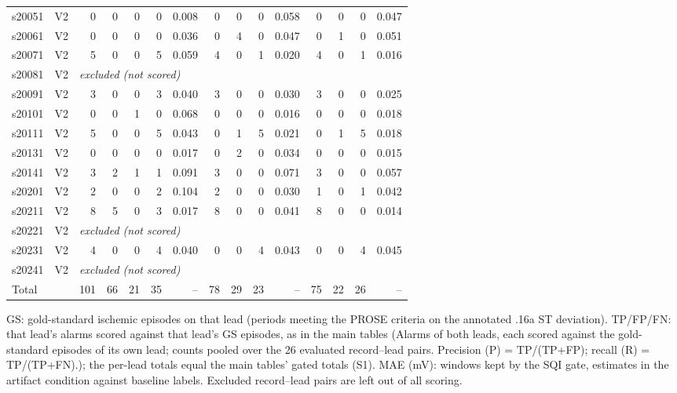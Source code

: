\begin{table}[htbp]
\begin{tabular}{llrrrrrrrrrrrrr}
s20051 & V2 & 0 & 0 & 0 & 0 & 0.008 & 0 & 0 & 0 & 0.058 & 0 & 0 & 0 & 0.047 \\
s20061 & V2 & 0 & 0 & 0 & 0 & 0.036 & 0 & 4 & 0 & 0.047 & 0 & 1 & 0 & 0.051 \\
s20071 & V2 & 5 & 0 & 0 & 5 & 0.059 & 4 & 0 & 1 & 0.020 & 4 & 0 & 1 & 0.016 \\
s20081 & V2 & \multicolumn{13}{l}{\textit{excluded (not scored)}} \\
s20091 & V2 & 3 & 0 & 0 & 3 & 0.040 & 3 & 0 & 0 & 0.030 & 3 & 0 & 0 & 0.025 \\
s20101 & V2 & 0 & 0 & 1 & 0 & 0.068 & 0 & 0 & 0 & 0.016 & 0 & 0 & 0 & 0.018 \\
s20111 & V2 & 5 & 0 & 0 & 5 & 0.043 & 0 & 1 & 5 & 0.021 & 0 & 1 & 5 & 0.018 \\
s20131 & V2 & 0 & 0 & 0 & 0 & 0.017 & 0 & 2 & 0 & 0.034 & 0 & 0 & 0 & 0.015 \\
s20141 & V2 & 3 & 2 & 1 & 1 & 0.091 & 3 & 0 & 0 & 0.071 & 3 & 0 & 0 & 0.057 \\
s20201 & V2 & 2 & 0 & 0 & 2 & 0.104 & 2 & 0 & 0 & 0.030 & 1 & 0 & 1 & 0.042 \\
s20211 & V2 & 8 & 5 & 0 & 3 & 0.017 & 8 & 0 & 0 & 0.041 & 8 & 0 & 0 & 0.014 \\
s20221 & V2 & \multicolumn{13}{l}{\textit{excluded (not scored)}} \\
s20231 & V2 & 4 & 0 & 0 & 4 & 0.040 & 0 & 0 & 4 & 0.043 & 0 & 0 & 4 & 0.045 \\
s20241 & V2 & \multicolumn{13}{l}{\textit{excluded (not scored)}} \\
\midrule
Total &  & 101 & 66 & 21 & 35 & -- & 78 & 29 & 23 & -- & 75 & 22 & 26 & -- \\
\bottomrule
\end{tabular}

\par\smallskip\footnotesize GS: gold-standard ischemic episodes on that lead (periods meeting the PROSE criteria on the annotated .16a ST deviation). TP/FP/FN: that lead's alarms scored against that lead's GS episodes, as in the main tables (Alarms of both leads, each scored against the gold-standard episodes of its own lead; counts pooled over the 26 evaluated record--lead pairs. Precision (P) = TP/(TP+FP); recall (R) = TP/(TP+FN).); the per-lead totals equal the main tables' gated totals (S1). MAE (mV): windows kept by the SQI gate, estimates in the artifact condition against baseline labels. Excluded record--lead pairs are left out of all scoring.
\end{table}
